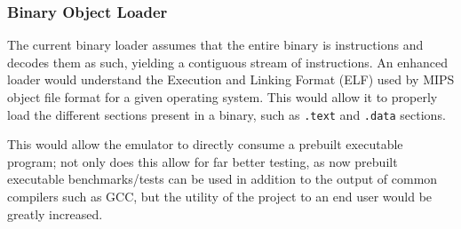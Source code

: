 \subsubsection{Binary Object Loader}

The current binary loader assumes that the entire binary is instructions and decodes them as such, yielding a contiguous stream of instructions. An enhanced loader would understand the Execution
and Linking Format (ELF) \cite{mips-guide} used by MIPS object file format for a given operating system. This would allow it to properly load the different sections present in a binary, such as \texttt{.text} and \texttt{.data} sections.

This would allow the emulator to directly consume a prebuilt executable program; not only does this allow for far better testing, as now prebuilt executable benchmarks/tests can be used in addition to the output of common compilers such as GCC, but the utility of the project to an end user would be greatly increased.